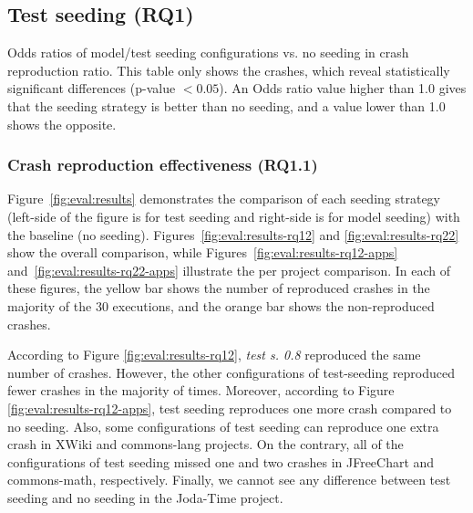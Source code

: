 \subsection{Test seeding (\textbf{RQ1})}


\begin{table}[t]
    \center
    \caption{Odds ratios of model/test seeding configurations vs. no seeding in crash reproduction ratio. This table only shows the crashes, which reveal statistically significant differences (p-value $< 0.05$). An Odds ratio value higher than 1.0 gives that the seeding strategy is better than no seeding, and a value lower than 1.0 shows the opposite.}
	\label{tab:oddratios}
	\footnotesize
	\subfloat{}
    \subfloat{}
\end{table}

\subsubsection{Crash reproduction effectiveness (\textbf{RQ1.1})}

Figure~\ref{fig:eval:results} demonstrates the comparison of each seeding strategy (left-side of the figure is for test seeding and right-side is for model seeding) with the baseline (no seeding). Figures~\ref{fig:eval:results-rq12} and \ref{fig:eval:results-rq22} show the overall comparison, while Figures~\ref{fig:eval:results-rq12-apps} and~\ref{fig:eval:results-rq22-apps} illustrate the per project comparison. In each of these figures, the yellow bar shows the number of reproduced crashes in the majority of the 30 executions, and the orange bar shows the non-reproduced crashes.

According to Figure \ref{fig:eval:results-rq12}, \textit{test s. 0.8} reproduced the same number of crashes. However, the other configurations of test-seeding reproduced fewer crashes in the majority of times. Moreover, according to Figure \ref{fig:eval:results-rq12-apps}, test seeding reproduces one more crash compared to no seeding. Also, some configurations of test seeding can reproduce one extra crash in  XWiki and commons-lang projects. On the contrary, all of the configurations of test seeding missed one and two crashes in JFreeChart and commons-math, respectively. Finally, we cannot see any difference between test seeding and no seeding in the Joda-Time project.
 
